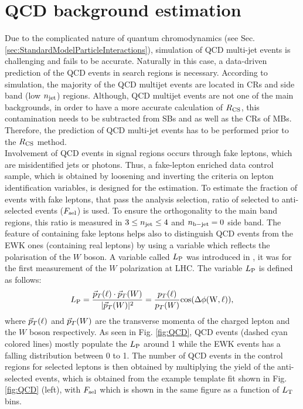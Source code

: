 \section{QCD background estimation}
\label{sec:QCDest}
Due to the complicated nature of quantum chromodynamics (see Sec. \ref{sec:StandardModelParticleInteractions}), simulation of QCD multi-jet events is challenging and fails to be accurate. Naturally in this case, a data-driven prediction of the QCD events in search regions is necessary.
According to simulation, the majority of the QCD multijet events are located in CRs and side band (low $n_{\rm jet}$) regions.
Although, QCD multijet events are not one of the main backgrounds, in order to have a more accurate calculation of $R_{\rm CS}$, this contamination needs to be subtracted from SBs and as well as the CRs of MBs. Therefore, the prediction of QCD multi-jet events has to be performed prior to the $R_{\rm CS}$ method.\\
Involvement of QCD events in signal regions occurs through fake leptons, which are misidentified jets or photons. Thus, a fake-lepton enriched data control sample, which is obtained by loosening and inverting the criteria on lepton identification variables, is designed for the estimation. To estimate the fraction of events with fake leptons, that pass the analysis selection, ratio of selected to anti-selected events ($F_{\rm sel}$) is used. To ensure the orthogonality to the main band regions, this ratio is measured in $3\leq n_{\rm jet}\leq4$ and $n_{\rm b-jet}=0$ side band. The feature of containing fake leptons helps also to distinguish QCD events from the EWK ones (containing real leptons) by using a variable which reflects the polarisation of the $W$ boson. A variable called $L_{\rm P}$ was introduced in \cite{LP}, it was for the first measurement of the $W$ polarization at LHC.
The variable $L_{\rm P}$ is defined as follows:
\begin{equation}
\label{eq:LP}
{\ensuremath{L_{\rm P}}} = \frac{\vec{p}_T(\ell)\cdot\vec{p}_T(W)}{|\vec{p}_T(W)|^2} = \frac{p_T(\ell)}{p_T(W)} \rm cos(\Delta \phi(W,\ell)),
\end{equation}
where $\vec{p}_T(\ell)$ and $\vec{p}_T(W)$ are the transverse momenta of the charged lepton and the $W$ boson respectively. 
As seen in Fig. \ref{fig:QCD}, QCD events (dashed cyan colored lines) mostly populate the $L_{\rm P}$ around 1 while the EWK events has a falling distribution between 0 to 1. The number of QCD events in the control regions for selected leptons is then obtained by multiplying the yield of the anti-selected events, which is obtained from the example template fit shown in Fig. \ref{fig:QCD} (left), with $F_{\rm sel}$ which is shown in the same figure as a function of $L_{\rm T}$ bins.\\
